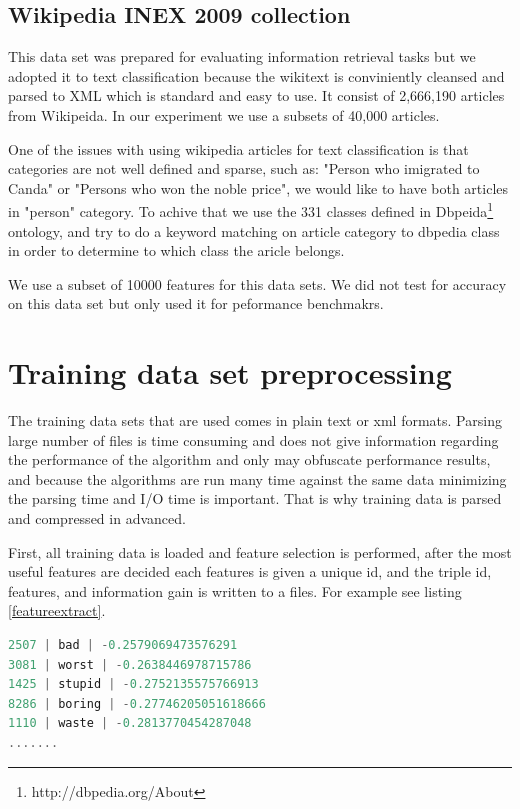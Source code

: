 \documentclass{report}
\begin{document}
\subsection{Wikipedia INEX 2009 collection}

This data set was prepared for evaluating information retrieval tasks but we adopted it to text classification because the wikitext is conviniently cleansed  and parsed to XML which is standard and easy to use. It consist of 2,666,190 articles from Wikipeida. In our experiment we use a subsets of 40,000 articles.

One of the issues with using wikipedia articles for text classification is that categories are not well defined and sparse, such as: "Person who imigrated to Canda" or "Persons who won the noble price", we would like to have both articles in "person" category. To achive that we use the 331 classes defined in Dbpeida\footnote{http://dbpedia.org/About} ontology, and try to do a keyword matching on article category to dbpedia class in order to determine to which class the aricle belongs.

We use a subset of 10000 features for this data sets. We did not test for accuracy on this data set but only used it for peformance benchmakrs.

\section{Training data set preprocessing}

The training data sets that are used comes in plain text or xml formats. Parsing large number of files is time consuming and does not give information regarding the performance of the algorithm and only may obfuscate performance results, and because the algorithms are run many time against the same data minimizing the parsing time and I/O time is important. That is why training data is parsed and compressed in advanced.

First, all training data is loaded and feature selection is performed, after the most useful features are decided each features is given a unique id, and the triple id, features, and information gain is written to a files. For example see listing \ref{featureextract}.

\begin{lstlisting}[language=scala, caption={Features file extract}, label={featureextract}]
2507 | bad | -0.2579069473576291
3081 | worst | -0.2638446978715786
1425 | stupid | -0.2752135575766913
8286 | boring | -0.27746205051618666
1110 | waste | -0.2813770454287048
.......
\end{lstlisting}
\end{document}
